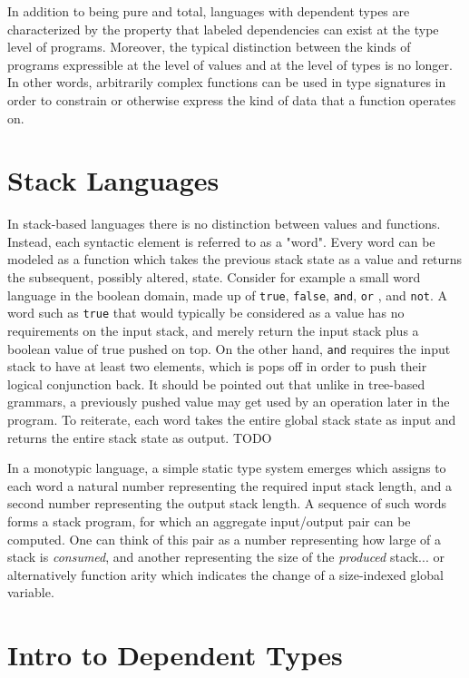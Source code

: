 \documentclass{acm_proc_article-sp}
\begin{document}
In addition to being pure and total, languages with dependent types
are characterized by the property that labeled dependencies can exist
at the type level of programs. Moreover, the typical distinction
between the kinds of programs expressible at the level of values and
at the level of types is no longer. In other words, arbitrarily
complex functions can be used in type signatures in order to constrain
or otherwise express the kind of data that a function operates on.

\section{Stack Languages}

In stack-based languages \cite{to:do} there is no
distinction between values and functions. Instead, each syntactic
element is referred to as a "word". Every word can be modeled as a
function which takes the previous stack state as a value and returns
the subsequent, possibly altered, state. Consider for example a
small word language in the boolean domain, made up of \texttt{true},
\texttt{false}, \texttt{and}, \texttt{or} , and \texttt{not}. A word
such as \texttt{true} that would typically be considered as a value
has no requirements on the input stack, and merely return the input
stack plus a boolean value of true pushed on top. On the other
hand, \texttt{and} requires the input stack to have at least two elements,
which is pops off in order to push their logical conjunction
back. It should be pointed out that unlike in tree-based grammars, a
previously pushed value may get used by an operation later in the
program. To reiterate, each word takes the entire global stack state
as input and returns the entire stack state as output. TODO

In a monotypic language, a simple static type system emerges which
assigns to each word a natural number representing the required input
stack length, and a second number representing the output stack
length. A sequence of such words forms a stack program, for which an
aggregate input/output pair can be computed. One can think of this
pair as a number representing how large of a stack is
\textit{consumed}, and another representing the size of the
\textit{produced} stack... or alternatively function arity which
indicates the change of a size-indexed global variable.

\section{Intro to Dependent Types}
\end{document}
